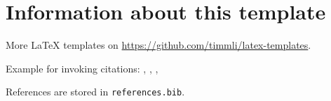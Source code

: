 \section{Information about this template}

More \LaTeX{} templates on \url{https://github.com/timmli/latex-templates}.

Example for invoking citations: \cite{Bech:63}, \citet[291]{Bech:63}, \citep{Bech:63}, \citealt{Bech:63}

References are stored in \texttt{references.bib}.
